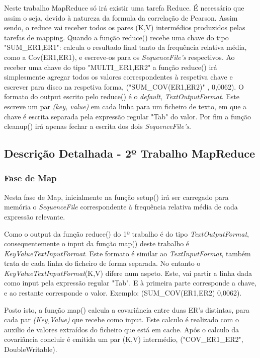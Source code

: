 Neste trabalho MapReduce só irá existir uma tarefa Reduce. É necessário que assim o seja, devido à natureza da formula da correlação de Pearson. Assim sendo, o reduce vai receber todos os pares (K,V) intermédios produzidos pelas tarefas de mapping.
Quando a função reduce() recebe uma chave do tipo "SUM\_ER1,ER1": calcula o resultado final tanto da frequência relativa média, como a Cov(ER1,ER1), e escreve-os para os \textit{SequenceFile's} respectivos. Ao receber uma chave do tipo "MULTI\_ER1,ER2" a função reduce() irá simplesmente agregar todos os valores correspondentes à respetiva chave e escrever para disco na respetiva forma, ("SUM\_COV(ER1,ER2)" , 0,0062). O formato do output escrito pelo reduce() é o \textit{default}, \textit{TextOutputFormat}. Este escreve um par \textit{(key, value)} em cada linha para um ficheiro de texto, em que a chave é escrita separada pela expressão regular "Tab" do valor. 
Por fim a função cleanup() irá apenas fechar a escrita dos dois \textit{SequenceFile's}.

\subsection{Descrição Detalhada - 2º Trabalho MapReduce}
\subsubsection{Fase de Map}
Nesta fase de Map, inicialmente na função setup() irá ser carregado para memória o \textit{SequenceFile} correspondente à frequência relativa média de cada expressão relevante. 

Como o output da função reduce() do 1º trabalho é do tipo \textit{TextOutputFormat}, consequentemente o input da função map() deste trabalho é \textit{KeyValueTextInputFormat}. Este formato é similar ao \textit{TextInputFormat}, também trata de cada linha do ficheiro de forma separada. No entanto o \textit{KeyValueTextInputFormat}(K,V) difere num aspeto. Este, vai partir a linha dada como input pela expressão regular "Tab". E à primeira parte corresponde a chave, e ao restante corresponde o valor. Exemplo: (SUM\_COV(ER1,ER2)    0,0062).

Posto isto, a função map() calcula a covariância entre duas ER's distintas, para cada par \textit{(Key,Value)} que recebe como input. Este calculo é realizado com o auxilio de valores extraídos do ficheiro que está em cache. Após o calculo da covariância concluir é emitida um par (K,V) intermédio, ("COV\_ER1\_ER2", DoubleWritable).

